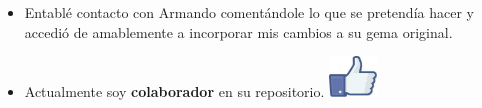 \documentclass{beamer}
\begin{document}
\begin{frame}[allowframebreaks]
\begin{itemize}
    \framebreak
    \item Entablé contacto con Armando comentándole lo que se pretendía hacer y
    accedió de amablemente a incorporar mis cambios a su gema original. 
    \item Actualmente soy {\bfseries colaborador} en su repositorio.
    \hspace*{0.8cm} 
    \includegraphics[width=0.1\textwidth]{img/like.eps}
  \end{itemize}
\end{frame}
  
\end{document}
